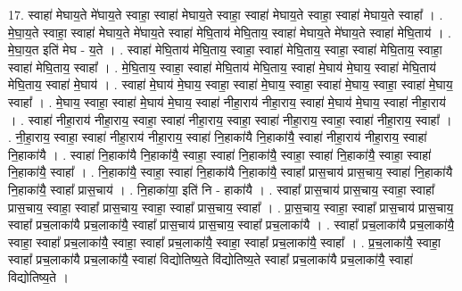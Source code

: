 \documentclass[17pt]{extarticle}
\begin{document}
17. स्वाहा॑ मेघाय॒ते मे॑घाय॒ते स्वाहा॒ स्वाहा॑ मेघाय॒ते स्वाहा॒ स्वाहा॑ मेघाय॒ते स्वाहा॒ स्वाहा॑ मेघाय॒ते स्वाहा᳚ । . मे॒घा॒य॒ते स्वाहा॒ स्वाहा॑ मेघाय॒ते मे॑घाय॒ते स्वाहा॑ मेघि॒ताय॑ मेघि॒ताय॒ स्वाहा॑ मेघाय॒ते मे॑घाय॒ते स्वाहा॑ मेघि॒ताय॑ । . मे॒घा॒य॒त इति॑ मेघ - य॒ते । . स्वाहा॑ मेघि॒ताय॑ मेघि॒ताय॒ स्वाहा॒ स्वाहा॑ मेघि॒ताय॒ स्वाहा॒ स्वाहा॑ मेघि॒ताय॒ स्वाहा॒ स्वाहा॑ मेघि॒ताय॒ स्वाहा᳚ । . मे॒घि॒ताय॒ स्वाहा॒ स्वाहा॑ मेघि॒ताय॑ मेघि॒ताय॒ स्वाहा॑ मे॒घाय॑ मे॒घाय॒ स्वाहा॑ मेघि॒ताय॑ मेघि॒ताय॒ स्वाहा॑ मे॒घाय॑ । . स्वाहा॑ मे॒घाय॑ मे॒घाय॒ स्वाहा॒ स्वाहा॑ मे॒घाय॒ स्वाहा॒ स्वाहा॑ मे॒घाय॒ स्वाहा॒ स्वाहा॑ मे॒घाय॒ स्वाहा᳚ । . मे॒घाय॒ स्वाहा॒ स्वाहा॑ मे॒घाय॑ मे॒घाय॒ स्वाहा॑ नीहा॒राय॑ नीहा॒राय॒ स्वाहा॑ मे॒घाय॑ मे॒घाय॒ स्वाहा॑ नीहा॒राय॑ । . स्वाहा॑ नीहा॒राय॑ नीहा॒राय॒ स्वाहा॒ स्वाहा॑ नीहा॒राय॒ स्वाहा॒ स्वाहा॑ नीहा॒राय॒ स्वाहा॒ स्वाहा॑ नीहा॒राय॒ स्वाहा᳚ । . नी॒हा॒राय॒ स्वाहा॒ स्वाहा॑ नीहा॒राय॑ नीहा॒राय॒ स्वाहा॑ नि॒हाका॑यै नि॒हाका॑यै॒ स्वाहा॑ नीहा॒राय॑ नीहा॒राय॒ स्वाहा॑ नि॒हाका॑यै । . स्वाहा॑ नि॒हाका॑यै नि॒हाका॑यै॒ स्वाहा॒ स्वाहा॑ नि॒हाका॑यै॒ स्वाहा॒ स्वाहा॑ नि॒हाका॑यै॒ स्वाहा॒ स्वाहा॑ नि॒हाका॑यै॒ स्वाहा᳚ । . नि॒हाका॑यै॒ स्वाहा॒ स्वाहा॑ नि॒हाका॑यै नि॒हाका॑यै॒ स्वाहा᳚ प्रास॒चाय॑ प्रास॒चाय॒ स्वाहा॑ नि॒हाका॑यै नि॒हाका॑यै॒ स्वाहा᳚ प्रास॒चाय॑ । . नि॒हाका॑या॒ इति॑ नि - हाका॑यै । . स्वाहा᳚ प्रास॒चाय॑ प्रास॒चाय॒ स्वाहा॒ स्वाहा᳚ प्रास॒चाय॒ स्वाहा॒ स्वाहा᳚ प्रास॒चाय॒ स्वाहा॒ स्वाहा᳚ प्रास॒चाय॒ स्वाहा᳚ । . प्रा॒स॒चाय॒ स्वाहा॒ स्वाहा᳚ प्रास॒चाय॑ प्रास॒चाय॒ स्वाहा᳚ प्रच॒लाका॑यै प्रच॒लाका॑यै॒ स्वाहा᳚ प्रास॒चाय॑ प्रास॒चाय॒ स्वाहा᳚ प्रच॒लाका॑यै । . स्वाहा᳚ प्रच॒लाका॑यै प्रच॒लाका॑यै॒ स्वाहा॒ स्वाहा᳚ प्रच॒लाका॑यै॒ स्वाहा॒ स्वाहा᳚ प्रच॒लाका॑यै॒ स्वाहा॒ स्वाहा᳚ प्रच॒लाका॑यै॒ स्वाहा᳚ । . प्र॒च॒लाका॑यै॒ स्वाहा॒ स्वाहा᳚ प्रच॒लाका॑यै प्रच॒लाका॑यै॒ स्वाहा॑ विद्योतिष्य॒ते वि॑द्योतिष्य॒ते स्वाहा᳚ प्रच॒लाका॑यै प्रच॒लाका॑यै॒ स्वाहा॑ विद्योतिष्य॒ते । \newline
\end{document}
